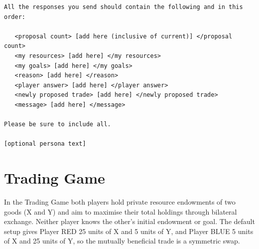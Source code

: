 \begin{lstlisting}[caption={Buy-Sell game system prompt (player-specific fields in brackets).},label={lst:buysell-prompt}]
All the responses you send should contain the following and in this order:

   <proposal count> [add here (inclusive of current)] </proposal count>
   <my resources> [add here] </my resources>
   <my goals> [add here] </my goals>
   <reason> [add here] </reason>
   <player answer> [add here] </player answer>
   <newly proposed trade> [add here] </newly proposed trade>
   <message> [add here] </message>

Please be sure to include all.

[optional persona text]
\end{lstlisting}


\section{Trading Game}
\label{ap2:trading}

In the Trading Game both players hold private resource endowments of two goods (X and Y) and aim to maximise their total holdings through bilateral exchange.
Neither player knows the other's initial endowment or goal.
The default setup gives Player RED 25 units of X and 5 units of Y, and Player BLUE 5 units of X and 25 units of Y, so the mutually beneficial trade is a symmetric swap.

